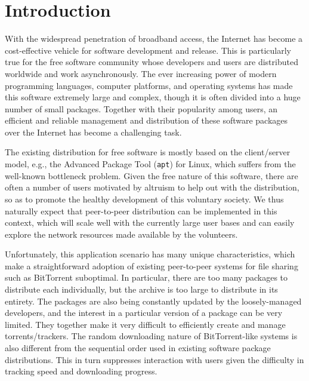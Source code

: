 \documentclass[conference]{IEEEtran}
\begin{document}

\section{Introduction}
\label{intro}

With the widespread penetration of broadband access, the Internet has become a cost-effective
vehicle for software development and release. This is particularly true for the free software
community whose developers and users are distributed worldwide and work asynchronously. The ever increasing power of
modern programming languages, computer platforms, and operating systems has made this software extremely large and complex,
though it is often divided into a huge number of small packages.
Together with their popularity among users,
an efficient and reliable management and distribution of these software packages over the Internet has become a challenging task.

The existing distribution for free software is mostly based on the client/server model, e.g.,
the Advanced Package Tool (\texttt{apt}) for Linux, which suffers from the well-known bottleneck problem.
Given the free nature of this software, there are often a number of users
motivated by altruism to help out with the distribution, so as to promote the healthy development
of this voluntary society.
We thus naturally expect that peer-to-peer distribution can be implemented in
this context, which will scale well with the currently large user bases and can easily explore the network resources made available by
the volunteers.

Unfortunately, this application scenario has many unique characteristics, which
make a straightforward adoption of existing peer-to-peer systems for file sharing such as BitTorrent suboptimal. In particular,
there are too many packages to distribute each individually, but the archive is
too large to distribute in its entirety. The packages are also being constantly
updated by the loosely-managed developers, and the interest in a particular version of a package can be very
limited. They together make it very difficult to efficiently create and manage torrents/trackers. The random downloading nature of BitTorrent-like systems is also different from the
sequential order used in existing software package distributions. This in turn suppresses interaction with users
given the difficulty in tracking speed and downloading progress.
\end{document}
